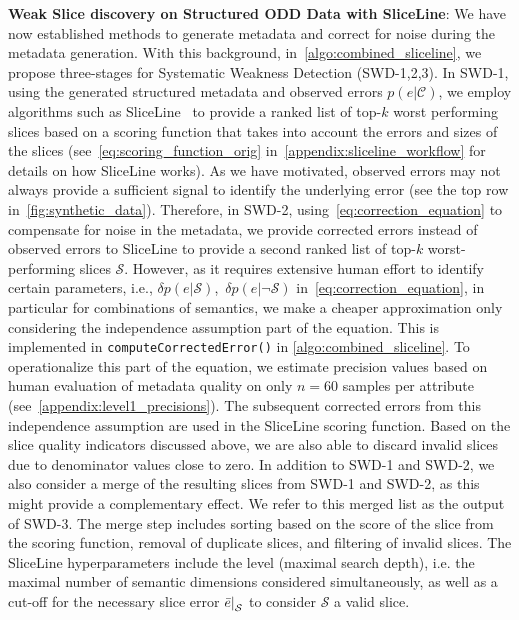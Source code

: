 \textbf{Weak Slice discovery on Structured ODD Data with SliceLine}: We have now established methods to generate metadata and correct for noise during the metadata generation.
With this background, in~\cref{algo:combined_sliceline}, we propose three-stages for Systematic Weakness Detection (SWD-1,2,3). In SWD-1, using the generated structured metadata and observed errors $p(e|\mathcal C)$, we employ algorithms such as SliceLine~\citep{sagadeeva2021sliceline} to provide a ranked list of top-$k$ worst performing slices based on a scoring function that takes into account the errors and sizes of the slices (see~\cref{eq:scoring_function_orig} in~\cref{appendix:sliceline_workflow} for details on how SliceLine works).
As we have motivated, observed errors may not always provide a sufficient signal to identify the underlying error (see the top row in~\cref{fig:synthetic_data}). Therefore, in SWD-2, using~\cref{eq:correction_equation} to compensate for noise in the metadata, we provide corrected errors instead of observed errors to SliceLine to provide a second ranked list of top-$k$ worst-performing slices $\mathcal{S}$. However, as it requires extensive human effort to identify certain parameters, i.e., $\delta p(e|\mathcal S)$,\ $\delta p(e|\neg\mathcal S)$ in~\cref{eq:correction_equation}, in particular for combinations of semantics, we make a cheaper approximation only considering the independence assumption part of the equation. This is implemented in \texttt{computeCorrectedError()} in \cref{algo:combined_sliceline}. To operationalize this part of the equation, we estimate precision values based on human evaluation of metadata quality on only $n=60$ samples per attribute (see~\cref{appendix:level1_precisions}). The subsequent corrected errors from this independence assumption are used in the SliceLine scoring function.
Based on the slice quality indicators discussed above, we are also able to discard invalid slices due to denominator values close to zero.
In addition to SWD-1 and SWD-2, we also consider a merge of the resulting slices from SWD-1 and SWD-2, as this might provide a complementary effect. We refer to this merged list as the output of SWD-3. The merge step includes sorting based on the score of the slice from the scoring function, removal of duplicate slices, and filtering of invalid slices. 
The SliceLine hyperparameters include the level (maximal search depth), i.e. the maximal number of semantic dimensions considered simultaneously, as well as a cut-off for the necessary slice error $\restr{\bar{e}}{\mathcal S}$ to consider $\mathcal S$ a valid slice.




